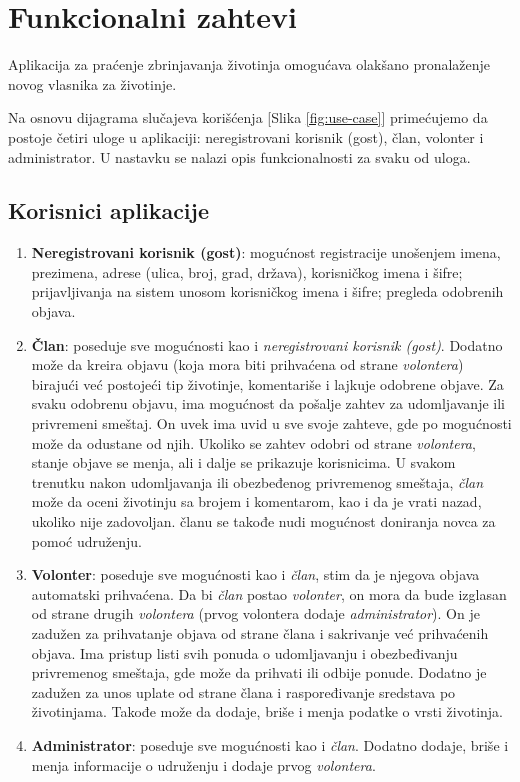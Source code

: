 \section{Funkcionalni zahtevi}
\par Aplikacija za praćenje zbrinjavanja životinja omogućava olakšano pronalaženje novog vlasnika za životinje. 
\par Na osnovu dijagrama slučajeva korišćenja [Slika \ref{fig:use-case}] primećujemo da postoje četiri uloge u aplikaciji: neregistrovani korisnik (gost), član, volonter i administrator. 
U nastavku se nalazi opis funkcionalnosti za svaku od uloga.
\subsection{Korisnici aplikacije}
\begin{enumerate}
    \item \textbf{Neregistrovani korisnik (gost)}: mogućnost registracije unošenjem imena, prezimena, adrese (ulica, broj, grad, država), korisničkog imena i šifre;
    prijavljivanja na sistem unosom korisničkog imena i šifre; pregleda odobrenih objava.
    \item \textbf{Član}: poseduje sve mogućnosti kao i \textit{neregistrovani korisnik (gost)}. Dodatno može da kreira objavu (koja mora biti prihvaćena od strane
    \textit{volontera}) birajući već postojeći tip životinje, komentariše i lajkuje odobrene objave. Za svaku odobrenu objavu, ima mogućnost da pošalje zahtev za udomljavanje ili 
    privremeni smeštaj. On uvek ima uvid u sve svoje zahteve, gde po mogućnosti može da odustane od njih. Ukoliko se zahtev odobri od strane \textit{volontera}, stanje objave se menja, 
    ali i dalje se prikazuje korisnicima. U svakom trenutku nakon udomljavanja ili obezbeđenog privremenog smeštaja, \textit{član} može da oceni životinju sa brojem i komentarom, 
    kao i da je vrati nazad, ukoliko nije zadovoljan. članu se takođe nudi mogućnost doniranja novca za pomoć udruženju.
    \item \textbf{Volonter}: poseduje sve mogućnosti kao i \textit{član}, stim da je njegova objava automatski prihvaćena. Da bi \textit{član} postao \textit{volonter}, on mora
    da bude izglasan od strane drugih \textit{volontera} (prvog volontera dodaje \textit{administrator}). On je zadužen za prihvatanje objava od strane člana i sakrivanje već 
    prihvaćenih objava. Ima pristup listi svih ponuda o udomljavanju i obezbeđivanju privremenog smeštaja, gde može da prihvati ili odbije ponude. Dodatno je zadužen za unos uplate od 
    strane člana i raspoređivanje sredstava po životinjama. Takođe može da dodaje, briše i menja podatke o vrsti životinja. 
    \item \textbf{Administrator}: poseduje sve mogućnosti kao i \textit{član}. Dodatno dodaje, briše i menja informacije o udruženju i dodaje prvog \textit{volontera}.
\end{enumerate}